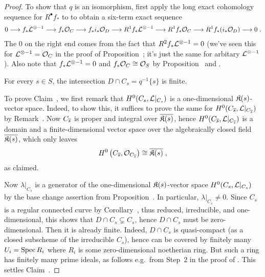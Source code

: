 \documentclass[a4paper,parskip=half,numbers=enddot, DIV=12]{scrreprt}
\begin{document}
\begin{proof}
	To show that $q$ is an isomorphism, first apply the long exact cohomology sequence for $R^\bullet f_*$ to  to obtain a six-term exact sequence
	\begin{align*}%
		0\morphism f_*\Ll^{\otimes -1}\morphism f_*\Oo_C\morphism f_*i_*\Oo_D\morphism R^1f_*\Ll^{\otimes -1}\morphism R^1f_*\Oo_C\morphism R^1f_*(i_*\Oo_D)\morphism 0\;.
	\end{align*}
	The $0$ on the right end comes from the fact that $R^2f_*\mathcal{L}^{\otimes -1}=0$ (we've seen this for $\mathcal{L}^{\otimes -1}=\mathcal{O}_C$ in the proof of Proposition~; it's just the same for arbitary $\mathcal{L}^{\otimes -1}$). Also note that $f_*\mathcal{L}^{\otimes -1}=0$ and $f_*\mathcal{O}_C\cong\mathcal{O}_S$ by Proposition~ and .
	\begin{claim}
		For every $s\in S$, the intersection $D\cap C_s=q^{-1}\{s\}$ is finite.
	\end{claim}
	To prove Claim~, we first remark that $H^0(C_s,\mathcal{L}|_{C_s})$ is a one-dimensional $\mathfrak{K}(s)$-vector space. Indeed, to show this, it suffices to prove the same for $H^0(C_{\overline{s}},\mathcal{L}|_{C_{\overline{s}}})$ by Remark~. Now $C_{\overline{s}}$ is proper and integral over $\overline{\mathfrak{K}(s)}$, hence $H^0(C_{\overline{s}},\mathcal{L}|_{C_{\overline{s}}})$ is a domain and a finite-dimensional vector space over the algebraically closed field $\overline{\mathfrak{K}(s)}$, which only leaves
	\begin{align*}
		H^0\left(C_{\overline{s}},\mathcal{O}_{C_{\overline{s}}}\right)\cong \overline{\mathfrak{K}(s)}\;,
	\end{align*}
	as claimed.
	
	Now $\lambda|_{C_s}$ is a generator of the one-dimensional $\mathfrak{K}(s)$-vector space $H^0(C_s,\mathcal{L}|_{C_s})$ by the base change assertion from Proposition~. In particular, $\lambda|_{C_s}\neq 0$. Since $C_s$ is a regular connected curve by Corollary~, thus reduced, irreducible, and one-dimensional, this shows that $D\cap C_s\subsetneq C_s$, hence $D\cap C_s$ must be zero-dimensional. Then it is already finite. Indeed, $D\cap C_s$ is quasi-compact (as a closed subscheme of the irreducible $C_s$), hence can be covered by finitely many $U_i=\operatorname{Spec} R_i$ where $R_i$ is some zero-dimensional noetherian ring. But such a ring has finitely many prime ideals, as follows e.g.\ from Step~2 in the proof of \cite[Proposition~3.1.1]{alg2}. This settles Claim~.
	

\end{proof}
\end{document}
